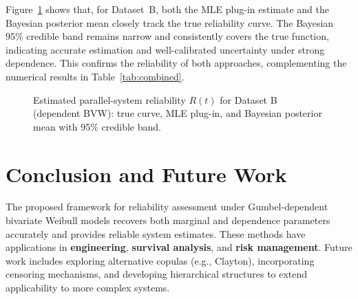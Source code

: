 \documentclass[twoside]{article}
\theoremstyle{plain}
\theoremstyle{definition}
\begin{document}
Figure~\ref{fig:reliability_case} shows that, for Dataset~B, both the MLE plug-in estimate and the Bayesian posterior mean closely track the true reliability curve. The Bayesian 95\% credible band remains narrow and consistently covers the true function, indicating accurate estimation and well-calibrated uncertainty under strong dependence. This confirms the reliability of both approaches, complementing the numerical results in Table~\ref{tab:combined}.
\begin{figure}[h!]
\centering
{}
\caption{Estimated parallel-system reliability $R(t)$ for Dataset B (dependent BVW): true curve, MLE plug-in, and Bayesian posterior mean with 95\% credible band.}
\label{fig:reliability_case}
\end{figure}

\section*{Conclusion and Future Work}

The proposed framework for reliability assessment under Gumbel-dependent
bivariate Weibull models recovers both marginal and dependence parameters
accurately and provides reliable system estimates. These methods have
applications in \textbf{engineering}, \textbf{survival analysis}, and
\textbf{risk management}. Future work includes exploring alternative copulas
(e.g., Clayton), incorporating censoring mechanisms, and developing
hierarchical structures to extend applicability to more complex systems.
\end{document}
